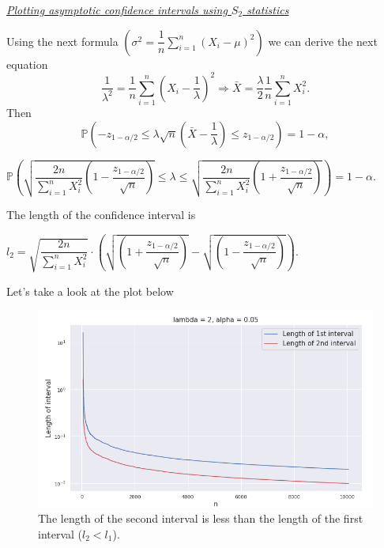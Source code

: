\documentclass[a4paper, 12pt]{article}
\renewcommand*{\P}{\mathbb{P}}
\begin{document}
\begin{center}
\large \itshape \underline{Plotting asymptotic confidence intervals using $S_2$ statistics}
\end{center}
Using the next formula $\left( \sigma^2 = \dfrac{1}{n} \sum \limits_{i=1}^n (X_i - \mu)^2 \right)$ we can derive the next equation 
$$
\dfrac{1}{\lambda^2} = \dfrac{1}{n} \sum \limits_{i=1}^n \left( X_i - \dfrac{1}{\lambda} \right)^2 \Rightarrow \bar{X} = \dfrac{\lambda}{2} \dfrac{1}{n} \sum \limits_{i=1}^n X_i^2.
$$	
Then
$$
\P \left( -z_{1 - \alpha/2} \leqslant \lambda \sqrt{n} \left( \bar{X} - \dfrac{1}{\lambda} \right) \leqslant z_{1- \alpha/2} \right) = 1 - \alpha,
$$
\begin{tcolorbox}
[enhanced,width=\textwidth,center upper,
 fontupper=\large\bfseries,
 drop fuzzy shadow southeast,
 colframe=red!50!black,colback=yellow!25]
$
\P \left( \sqrt{ \dfrac{2n}{\sum \limits_{i=1}^n X_i^2} \left( 1 - \dfrac{z_{1 - \alpha/2}}{\sqrt{n}} \right) } \leqslant \lambda \leqslant \sqrt{ \dfrac{2n}{\sum \limits_{i=1}^n X_i^2} \left( 1 + \dfrac{z_{1 - \alpha/2}}{\sqrt{n}} \right) } \right) = 1 - \alpha.
$
\end{tcolorbox}
The length of the confidence interval is
\begin{tcolorbox}
[enhanced,width=\textwidth,center upper,
 fontupper=\large\bfseries,
 drop fuzzy shadow southeast,
 colframe=red!50!black,colback=yellow!25]
$
l_2 = \sqrt{ \dfrac{2n}{\sum \limits_{i=1}^n X_i^2} } \cdot \left( \sqrt{ \left( 1 + \dfrac{z_{1 - \alpha/2}}{\sqrt{n}} \right) } - \sqrt{ \left( 1 - \dfrac{z_{1 - \alpha/2}}{\sqrt{n}} \right) } \right).
$
\end{tcolorbox}
Let's take a look at the plot below
\begin{figure}[H]
\includegraphics[width=\textwidth]{Images/1_1_2.png}
\caption{The length of the second interval is less than the length of the first interval ($l_2 < l_1$).}
\end{figure}
\end{document}
